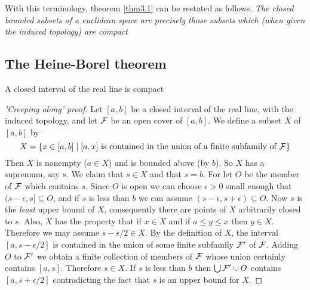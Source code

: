 \documentclass[11pt]{article}
\begin{document}
With this terminology, theorem \ref{thm3.1} can be restated as follows.
\emph{The closed bounded subsets of a euclidean space are precisely those subsets}
\emph{which (when given the induced topology) are compact}

\subsection{The Heine-Borel theorem}
\label{sec:org2df4647}
\begin{theorem}
\label{thm3.3}
A closed interval of the real line is compact
\end{theorem}

\begin{proof}['Creeping along' proof]
Let \([a,b]\) be a closed interval of the real line, with the induced
topology, and let \(\mathcal{F}\) be an open cover of \([a,b]\). We define a subset
\(X\) of \([a,b]\) by
\begin{equation*}
X=\{x\in[a,b]\mid[a,x]\text{ is contained in the union of a finite subfamily of }\mathcal{F}\}
\end{equation*}
Then \(X\) is nonempty (\(a\in X\)) and is bounded above (by \(b\)). So \(X\)
has a supremum, say \(s\). We claim that \(s\in X\) and that \(s=b\). For let
\(O\) be the member of \(\mathcal{F}\) which contains \(s\). Since \(O\) is open we
can choose \(\epsilon>0\) small enough that \((s-\epsilon,s]\subseteq O\), and if
\(s\) is less than \(b\) we can assume \((s-\epsilon,s+\epsilon)\subseteq
   O\). Now \(s\) is the \emph{least} upper bound of \(X\), consequently there are
points of \(X\) arbitrarily closed to \(s\). Also, \(X\) has the property
that if \(x\in X\) and if \(a\le y\le x\) then \(y\in X\). Therefore we may
assume \(s-\epsilon/2\in X\). By the definition of \(X\), the interval
\([a,s-\epsilon/2]\) is contained in the union of some finite subfamily
\(\mathcal{F}'\) of \(\mathcal{F}\). Adding \(O\) to \(\mathcal{F}'\) we obtain a finite
collection of members of \(\mathcal{F}\) whose union certainly contains \([a,s]\).
Therefore \(s\in X\). If \(s\) is less than \(b\) then \(\bigcup\mathcal{F}'\cup
   O\) contains \([a,s+\epsilon/2]\) contradicting the fact that \(s\) is an
upper bound for \(X\).
\end{proof}
\end{document}
